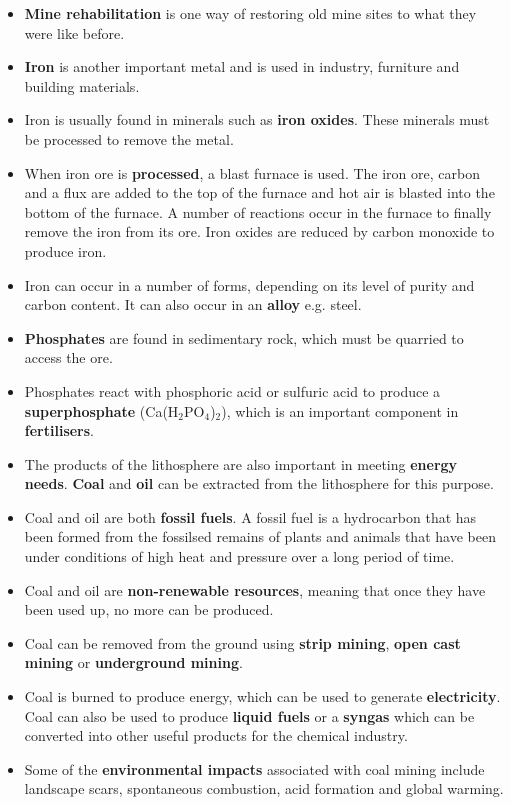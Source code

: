 \begin{itemize}
\item{\textbf{Mine rehabilitation} is one way of restoring old mine sites to what they were like before.}
\item{\textbf{Iron} is another important metal and is used in industry, furniture and building materials.}
\item{Iron is usually found in minerals such as \textbf{iron oxides}. These minerals must be processed to remove the metal.}
\item{When iron ore is \textbf{processed}, a blast furnace is used. The iron ore, carbon and a flux are added to the top of the furnace and hot air is blasted into the bottom of the furnace. A number of reactions occur in the furnace to finally remove the iron from its ore. Iron oxides are reduced by carbon monoxide to produce iron.}
\item{Iron can occur in a number of forms, depending on its level of purity and carbon content. It can also occur in an \textbf{alloy} e.g. steel.}
\item{\textbf{Phosphates} are found in sedimentary rock, which must be quarried to access the ore.}
\item{Phosphates react with phosphoric acid or sulfuric acid to produce a \textbf{superphosphate} (Ca(H$_{2}$PO$_{4}$)$_{2}$), which is an important component in \textbf{fertilisers}.}
\item{The products of the lithosphere are also important in meeting \textbf{energy needs}. \textbf{Coal} and \textbf{oil} can be extracted from the lithosphere for this purpose.}
\item{Coal and oil are both \textbf{fossil fuels}. A fossil fuel is a hydrocarbon that has been formed from the fossilsed remains of plants and animals that have been under conditions of high heat and pressure over a long period of time.}
\item{Coal and oil are \textbf{non-renewable resources}, meaning that once they have been used up, no more can be produced.}
\item{Coal can be removed from the ground using \textbf{strip mining}, \textbf{open cast mining} or \textbf{underground mining}. }
\item{Coal is burned to produce energy, which can be used to generate \textbf{electricity}. Coal can also be used to produce \textbf{liquid fuels} or a \textbf{syngas} which can be converted into other useful products for the chemical industry.}
\item{Some of the \textbf{environmental impacts} associated with coal mining include landscape scars, spontaneous combustion, acid formation and global warming.}

\end{itemize}
